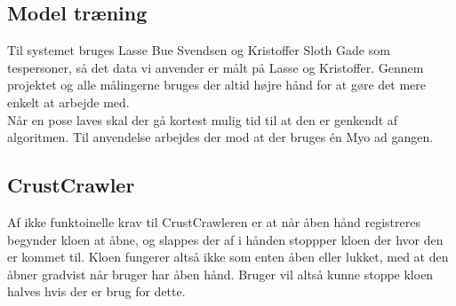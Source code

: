\subsection{Model træning}
Til systemet bruges Lasse Bue Svendsen og Kristoffer Sloth Gade som tespersoner, så det data vi anvender er målt på Lasse og Kristoffer. Gennem projektet og alle målingerne bruges der altid højre hånd for at gøre det mere enkelt at arbejde med.\\
Når en pose laves skal der gå kortest mulig tid til at den er genkendt af algoritmen. Til anvendelse arbejdes der mod at der bruges én Myo ad gangen.


\subsection{CrustCrawler}
Af ikke funktoinelle krav til CrustCrawleren er at når åben hånd registreres begynder kloen at åbne, og slappes der af i hånden stoppper kloen der hvor den er kommet til. Kloen fungerer altså ikke som enten åben eller lukket, med at den åbner gradvist når bruger har åben hånd. Bruger vil altså kunne stoppe kloen halves hvis der er brug for dette.